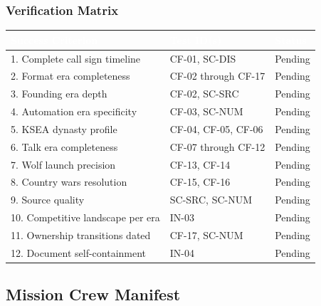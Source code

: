 \documentclass[11pt,letterpaper]{article}
\newcommand{\tableheader}[1]{\textbf{\sffamily\textcolor{white}{#1}}}
\begin{document}
\subsubsection{Verification Matrix}

\begin{center}
\begin{tabularx}{\textwidth}{XL{3.5cm}C{1.5cm}}
\toprule
{}
\tableheader{Success Criterion} & \tableheader{Test ID(s)} & \tableheader{Status} \\
. Complete call sign timeline & CF-01, SC-DIS & Pending \\
2. Format era completeness & CF-02 through CF-17 & Pending \\
3. Founding era depth & CF-02, SC-SRC & Pending \\
4. Automation era specificity & CF-03, SC-NUM & Pending \\
5. KSEA dynasty profile & CF-04, CF-05, CF-06 & Pending \\
6. Talk era completeness & CF-07 through CF-12 & Pending \\
7. Wolf launch precision & CF-13, CF-14 & Pending \\
8. Country wars resolution & CF-15, CF-16 & Pending \\
9. Source quality & SC-SRC, SC-NUM & Pending \\
10. Competitive landscape per era & IN-03 & Pending \\
11. Ownership transitions dated & CF-17, SC-NUM & Pending \\
12. Document self-containment & IN-04 & Pending \\
\bottomrule
\end{tabularx}
\end{center}

\subsection{Mission Crew Manifest}
\end{document}
